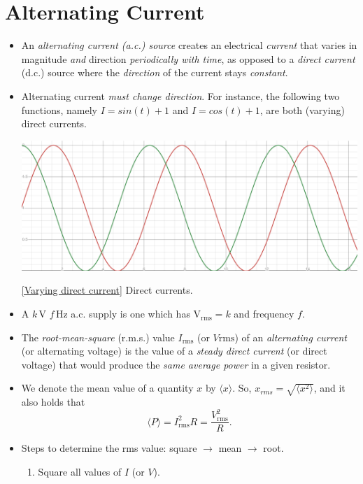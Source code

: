 \documentclass[oneside]{book}
\begin{document}
\chapter{Alternating Current}
\begin{itemize}
    \item An \emph{alternating current (a.c.) source} creates an electrical \emph{current} that varies in magnitude \emph{and} direction \emph{periodically with time}, as opposed to a \emph{direct current} (d.c.) source where the \emph{direction} of the current stays \emph{constant}. 
    \item Alternating current \emph{must change direction}. For instance, the following two functions, namely \(I=sin(t)+1\) and \(I=cos(t)+1\), are both (varying) direct currents.
    \begin{center}
        \includegraphics[width=\textwidth-25pt]{../images/Varying-Direct-Current.png}
        \captionsetup{type=figure}
        \caption[figure]{\ref{Varying direct current} Direct currents.}
    \end{center}
    \item A \(k\,\text{V}\) \(f\,\text{Hz}\) a.c. supply is one which has \(\text{V}_\text{rms}=k\) and frequency \(f\).
    \item The \emph{root-mean-square} (r.m.s.) value \(I_{\text{rms}}\) (or \(V\text{rms}\)) of an \emph{alternating current} (or alternating voltage) is the value of a \emph{steady direct current} (or direct voltage) that would produce the \emph{same average power} in a given resistor.
    \item We denote the mean value of a quantity \(x\) by \(\langle x \rangle\). So, \(x_{rms}=\sqrt{\langle x^2 \rangle}\), and it also holds that
    \[\langle P \rangle=I_\text{rms}^2R=\frac{V_\text{rms}^2}{R}.\]
    \item Steps to determine the rms value: square \(\to\) mean  \(\to\) root.
    \begin{enumerate}
        \item Square all values of \(I\) (or \(V\)).

\end{enumerate}
\end{itemize}
\end{document}

